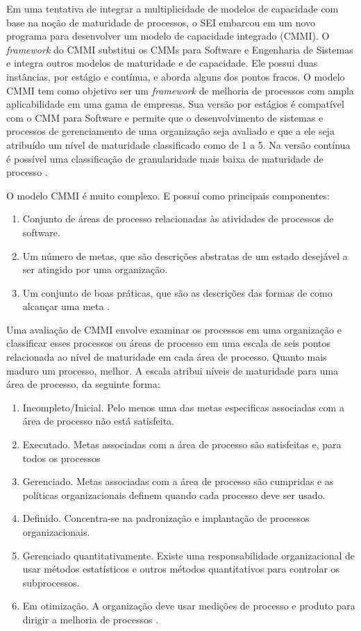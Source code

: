 \documentclass[12pt]{article}
\begin{document}
Em uma tentativa de integrar a multiplicidade de modelos de capacidade com base na noção de maturidade de processos, o SEI embarcou em um novo programa para desenvolver um modelo de capacidade integrado (CMMI). O \textit{framework} do CMMI substitui os CMMs para Software e Engenharia de Sistemas e integra outros modelos de maturidade e de capacidade. Ele possui duas instâncias, por estágio e contínua, e aborda alguns dos pontos fracos. O modelo CMMI tem como objetivo ser um \textit{framework} de melhoria de processos com ampla aplicabilidade em uma gama de empresas. Sua versão por estágios é compatível com o CMM para Software e permite que o desenvolvimento de sistemas e processos de gerenciamento de uma organização seja avaliado e que a ele seja atribuído um nível de maturidade classificado como de 1 a 5. Na versão contínua é possível uma classificação de granularidade mais baixa de maturidade de processo \cite{sommerville2007engenharia}.

O modelo CMMI é muito complexo. E possuí como principais componentes:
\begin{enumerate}
    \item Conjunto de áreas de processo relacionadas às atividades de processos de software.
    \item Um número de metas, que são descrições abstratas de um estado desejável a ser atingido por uma organização.
    \item Um conjunto de boas práticas, que são as descrições das formas de como alcançar uma meta \cite{sommerville2007engenharia}.
\end{enumerate}

Uma avaliação de CMMI envolve examinar os processos em uma organização e classificar esses processos ou áreas de processo em uma escala de seis pontos relacionada ao nível de maturidade em cada área de processo. Quanto mais maduro um processo, melhor. A escala atribui níveis de maturidade para uma área de processo, da seguinte forma:
\begin{enumerate}
    \item Incompleto/Inicial. Pelo menos uma das metas especificas associadas com a área de processo não está satisfeita.
    \item Executado. Metas associadas com a área de processo são satisfeitas e, para todos os processos
    \item Gerenciado. Metas associadas com a área de processo são cumpridas e as políticas organizacionais definem quando cada processo deve ser usado.
    \item Definido. Concentra-se na padronização e implantação de processos organizacionais.
    \item Gerenciado quantitativamente. Existe uma responsabilidade organizacional de usar métodos estatísticos e outros métodos quantitativos para controlar os subprocessos.
    \item Em otimização. A organização deve usar medições de processo e produto para dirigir a melhoria de processos \cite{sommerville2007engenharia}.
\end{enumerate}
\end{document}
